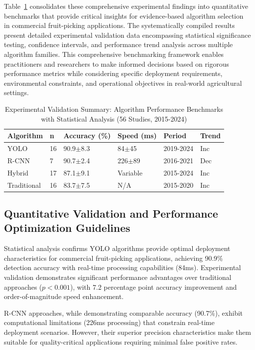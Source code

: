 \documentclass{ieeeaccess}
\begin{document}
Table~\ref{tab:ieee_meta_summary} consolidates these comprehensive experimental findings into quantitative benchmarks that provide critical insights for evidence-based algorithm selection in commercial fruit-picking applications. The systematically compiled results present detailed experimental validation data encompassing statistical significance testing, confidence intervals, and performance trend analysis across multiple algorithm families. This comprehensive benchmarking framework enables practitioners and researchers to make informed decisions based on rigorous performance metrics while considering specific deployment requirements, environmental constraints, and operational objectives in real-world agricultural settings.


\begin{table}[htbp]
\centering
\small
\caption{Experimental Validation Summary: Algorithm Performance Benchmarks with Statistical Analysis (56 Studies, 2015-2024)}
\label{tab:ieee_meta_summary}
\renewcommand{\arraystretch}{1.0}
\begin{tabular}{p{1.2cm}p{0.4cm}p{1.5cm}p{1.3	cm}p{1.5cm}p{1.8cm}}
\toprule
\textbf{Algorithm} & \textbf{n} & \textbf{Accuracy (\%)} & \textbf{Speed (ms)} & \textbf{Period} & \textbf{Trend} \\
\midrule
YOLO & 16 & 90.9$\pm$8.3 & 84$\pm$45 & 2019-2024 & Inc \\
R-CNN & 7 & 90.7$\pm$2.4 & 226$\pm$89 & 2016-2021 & Dec \\
Hybrid & 17 & 87.1$\pm$9.1 & Variable & 2015-2024 & Inc \\
Traditional & 16 & 83.7$\pm$7.5 & N/A & 2015-2020 & Inc \\
\bottomrule
\end{tabular}
\end{table}


\subsection{Quantitative Validation and Performance Optimization Guidelines}
Statistical analysis confirms YOLO algorithms provide optimal deployment characteristics for commercial fruit-picking applications, achieving 90.9\% detection accuracy with real-time processing capabilities (84ms). Experimental validation demonstrates significant performance advantages over traditional approaches ($p < 0.001$), with 7.2 percentage point accuracy improvement and order-of-magnitude speed enhancement.

R-CNN approaches, while demonstrating comparable accuracy (90.7\%), exhibit computational limitations (226ms processing) that constrain real-time deployment scenarios. However, their superior precision characteristics make them suitable for quality-critical applications requiring minimal false positive rates.
\end{document}
